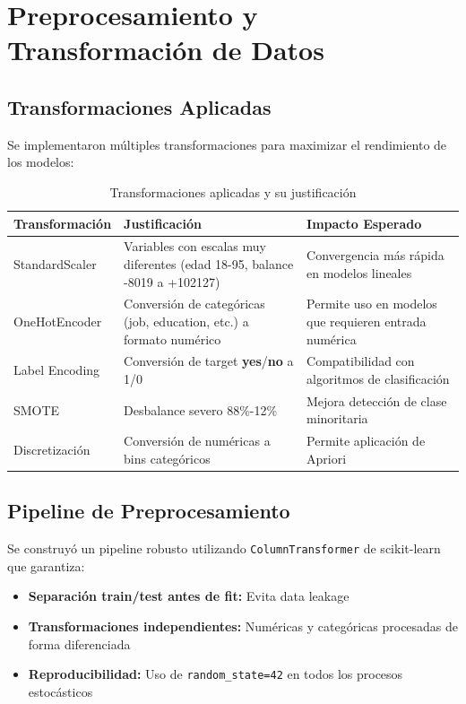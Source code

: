 \documentclass[12pt,letterpaper]{article}
\begin{document}
\newpage
\section{Preprocesamiento y Transformación de Datos}

\subsection{Transformaciones Aplicadas}

Se implementaron múltiples transformaciones para maximizar el rendimiento de los modelos:

\begin{table}[H]
\centering
\caption{Transformaciones aplicadas y su justificación}
\label{tab:transformaciones}
\begin{tabular}{@{}lp{6cm}p{4cm}@{}}
\toprule
\textbf{Transformación} & \textbf{Justificación} & \textbf{Impacto Esperado} \\
\midrule
StandardScaler & Variables con escalas muy diferentes (edad 18-95, balance -8019 a +102127) & Convergencia más rápida en modelos lineales \\
\midrule
OneHotEncoder & Conversión de categóricas (job, education, etc.) a formato numérico & Permite uso en modelos que requieren entrada numérica \\
\midrule
Label Encoding & Conversión de target \textbf{yes}/\textbf{no} a 1/0 & Compatibilidad con algoritmos de clasificación \\
\midrule
SMOTE & Desbalance severo 88\%-12\% & Mejora detección de clase minoritaria \\
\midrule
Discretización & Conversión de numéricas a bins categóricos & Permite aplicación de Apriori \\
\bottomrule
\end{tabular}
\end{table}

\subsection{Pipeline de Preprocesamiento}

Se construyó un pipeline robusto utilizando \texttt{ColumnTransformer} de scikit-learn que garantiza:

\begin{itemize}
    \item \textbf{Separación train/test antes de fit:} Evita data leakage
    \item \textbf{Transformaciones independientes:} Numéricas y categóricas procesadas de forma diferenciada
    \item \textbf{Reproducibilidad:} Uso de \texttt{random\_state=42} en todos los procesos estocásticos
\end{itemize}
\end{document}
